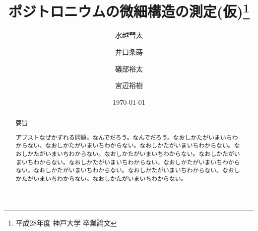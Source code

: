 \documentclass[uplatex,report,10pt,a4paper]{jsbook}
\begin{document}
\title{ポジトロニウムの微細構造の測定(仮)\thanks{平成28年度 神戸大学 卒業論文}}
\author{水越彗太\and 井口条蒔\and 礒部裕太\and 宮辺裕樹}
\date{\today}

\maketitle
\newpage

\tableofcontents
\listoffigures
\listoftables

\newpage

\begin{abstract}
要旨

アブストなぜかずれる問題。なんでだろう。なんでだろう。なおしかたがいまいちわからない。なおしかたがいまいちわからない。なおしかたがいまいちわからない。なおしかたがいまいちわからない。なおしかたがいまいちわからない。なおしかたがいまいちわからない。なおしかたがいまいちわからない。なおしかたがいまいちわからない。なおしかたがいまいちわからない。なおしかたがいまいちわからない。なおしかたがいまいちわからない。なおしかたがいまいちわからない。

\end{abstract}

%









%
%


\end{document}
